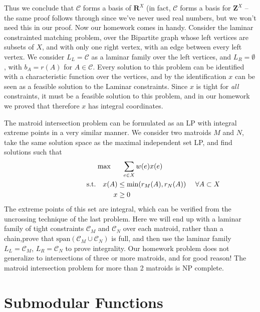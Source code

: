 Thus we conclude that $\mathcal{C}$ forms a basis of $\mathbf{R}^X$ (in fact, $\mathcal{C}$ forms a basis for $\mathbf{Z}^X$ -- the same proof follows through since we've never used real numbers, but we won't need this in our proof. Now our homework comes in handy. Consider the laminar constrainted matching problem, over the Bipartite graph whose left vertices are subsets of $X$, and with only one right vertex, with an edge between every left vertex. We consider $L_L = \mathcal{C}$ as a laminar family over the left vertices, and $L_R = \emptyset$, with $b_A = r(A)$ for $A \in \mathcal{C}$. Every solution to this problem can be identified with a characteristic function over the vertices, and by the identification $x$ can be seen as a feasible solution to the Laminar constraints. Since $x$ is tight for {\it all} constraints, it must be a feasible solution to this problem, and in our homework we proved that therefore $x$ has integral coordinates.

The matroid intersection problem can be formulated as an LP with integral extreme points in a very similar manner. We consider two matroids $M$ and $N$, take the same solution space as the maximal independent set LP, and find solutions such that
%
\begin{gather*}
\max \quad\ \ \sum_{e \in X} w(e) x(e) \\
\begin{aligned}
\ \ \ \ \ \ \ \ \ \ \ \ \ \ \ \ \ \ \ \ \textup{s.t.} \quad x(A) &\leq \min(r_M(A), r_N(A))\ \ \ \ \forall A \subset X \\
                  x &\geq 0
\end{aligned}
\end{gather*}
%
The extreme points of this set are integral, which can be verified from the uncrossing technique of the last problem. Here we will end up with a laminar family of tight constraints $\mathcal{C}_M$ and $\mathcal{C}_N$ over each matroid, rather than a chain,prove that $\text{span}(\mathcal{C}_M \cup \mathcal{C}_N)$ is full, and then use the laminar family $L_L = \mathcal{C}_M$, $L_R = \mathcal{C}_N$ to prove integrality. Our homework problem does not generalize to intersections of three or more matroids, and for good reason! The matroid intersection problem for more than 2 matroids is NP complete.

\chapter{Submodular Functions}

